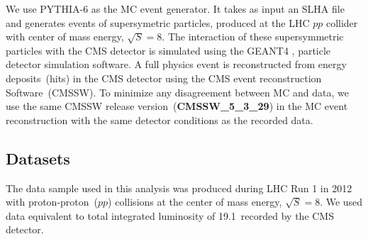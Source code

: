 We use \textsf{PYTHIA}-6 \cite{PYTHIA6} as the MC event generator. It takes as input an SLHA file and generates events of supersymetric particles, produced at the LHC $pp$ collider with center of mass energy, $\sqrt{S} = 8$\TeV. The interaction of these supersymmetric particles with the CMS detector is simulated using the \textsf{GEANT}4 \cite{GEANT4}, particle detector simulation software. A full physics event is reconstructed from energy deposits~(hits) in the CMS detector using the CMS event reconstruction Software~(CMSSW). To minimize any disagreement between MC and data, we use the same CMSSW release version~(\textbf{CMSSW\_5\_3\_29}) in the MC event reconstruction with the same detector conditions as the recorded data.%


\subsection{Datasets}
The data sample used in this analysis was produced during LHC Run 1 in 2012 with proton-proton~($pp$) collisions at the center of mass energy, $\sqrt{S} = 8$\TeV. We used data equivalent to total integrated luminosity of 19.1~\fbinv recorded by the CMS detector.
